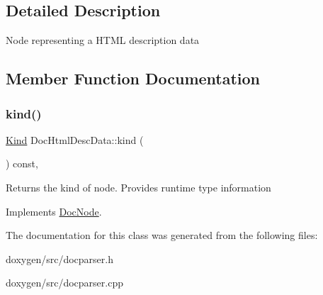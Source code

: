 \subsection{Detailed Description}
Node representing a H\+T\+ML description data 

\subsection{Member Function Documentation}
\mbox{\label{class_doc_html_desc_data_a2ed43e5b814b9659e22be4569babebad}} 
\subsubsection{\texorpdfstring{kind()}{kind()}}
{\footnotesize\ttfamily \mbox{\hyperlink{class_doc_node_aebd16e89ca590d84cbd40543ea5faadb}{Kind}} Doc\+Html\+Desc\+Data\+::kind (\begin{DoxyParamCaption}{ }\end{DoxyParamCaption}) const\hspace{0.3cm}{\ttfamily [inline]}, {\ttfamily [virtual]}}

Returns the kind of node. Provides runtime type information 

Implements \mbox{\hyperlink{class_doc_node_a108ffd214a72ba6e93dac084a8f58049}{Doc\+Node}}.



The documentation for this class was generated from the following files\+:\begin{DoxyCompactItemize}
\item 
doxygen/src/docparser.\+h\item 
doxygen/src/docparser.\+cpp\end{DoxyCompactItemize}
